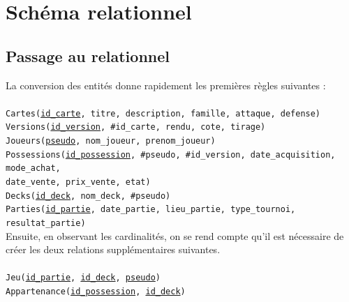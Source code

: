 \documentclass[a4paper,10.5pt]{article}
\begin{document}
\section{Schéma relationnel}
\subsection{Passage au relationnel}

La conversion des entités donne rapidement les premières règles suivantes :\\
\\
\texttt{Cartes(\underline{id\_carte}, titre, description, famille, attaque, defense)} \\
\texttt{Versions(\underline{id\_version}, \#id\_carte, rendu, cote, tirage)} \\
\texttt{Joueurs(\underline{pseudo}, nom\_joueur, prenom\_joueur)} \\
\texttt{Possessions(\underline{id\_possession}, \#pseudo, \#id\_version, date\_acquisition, mode\_achat,\\ date\_vente, prix\_vente, etat)} \\
\texttt{Decks(\underline{id\_deck}, nom\_deck, \#pseudo)} \\
\texttt{Parties(\underline{id\_partie}, date\_partie, lieu\_partie, type\_tournoi, resultat\_partie)} \\

Ensuite, en observant les cardinalités, on se rend compte qu'il est nécessaire de créer les deux relations supplémentaires suivantes. \\
\\
\texttt{Jeu(\underline{id\_partie}, \underline{id\_deck}, \underline{pseudo})} \\
\texttt{Appartenance(\underline{id\_possession}, \underline{id\_deck})} \\
\end{document}
